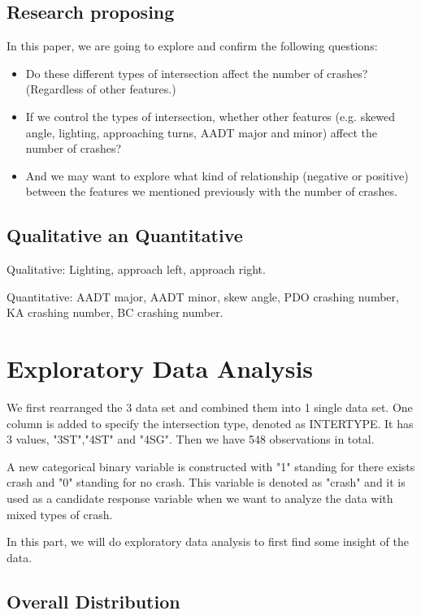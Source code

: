 \documentclass[11pt]{scrartcl} %
\begin{document}
\subsection{Research proposing}

In this paper, we are going to explore and confirm the following questions:

\begin{itemize}
	\item Do these different types of intersection affect the number of crashes? (Regardless of other features.)
	\item If we control the types of intersection, whether other features (e.g. skewed angle, lighting, approaching turns, AADT major and minor) affect the number of crashes?
	\item And we may want to explore what kind of relationship (negative or positive) between the features we mentioned previously with the number of crashes.
\end{itemize}

\subsection{Qualitative an Quantitative}

Qualitative: Lighting, approach left, approach right.

Quantitative: AADT major, AADT minor, skew angle, PDO crashing number, KA crashing number, BC crashing number.




\section{Exploratory Data Analysis}
We first rearranged the 3 data set and combined them into 1 single data set. One column is added to specify the intersection type, denoted as INTERTYPE. It has 3 values, "3ST","4ST" and "4SG". Then we have 548 observations in total.

A new categorical binary variable is constructed with "1" standing for there exists crash and "0" standing for no crash. This variable is denoted as "crash" and it is used as a candidate response variable when we want to analyze the data with mixed types of crash.

In this part, we will do exploratory data analysis to first find some insight of the data.

\subsection{Overall Distribution}
\end{document}
